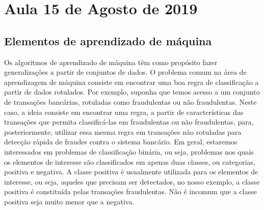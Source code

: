 

\section{Aula 15 de Agosto de 2019}
\label{2019_08_15}



\subsection{Elementos de aprendizado de máquina}

Os algoritmos de aprendizado de máquina têm como propósito fazer generalizações a partir de conjuntos de dados. O problema comum na área de aprendizagem de máquina consiste em encontrar uma boa regra de classificação a partir de dados rotulados. Por exemplo, suponha que temos acesso a um conjunto de transações bancárias, rotuladas como fraudulentas ou não fraudulentas. Neste caso, a ideia consiste em encontrar uma regra, a partir de características das transações que permita classificá-las em fraudulentas ou não fraudulentas, para, posteriormente, utilizar essa mesma regra em transações não rotuladas para detecção rápida de fraudes contra o sistema bancário. Em geral, estaremos interessados em problemas de classificação binária, ou seja, problemas nos quais os elementos de interesse são classificados em apenas duas classes, ou categorias, positiva e negativa. A classe positiva é usualmente utilizada para os elementos de interesse, ou seja, aqueles que precisam ser detectados, no nosso exemplo, a classe positiva é constituída pelas transações fraudulentas. Não é incomum que a classe positiva seja muito menor que a negativa.


